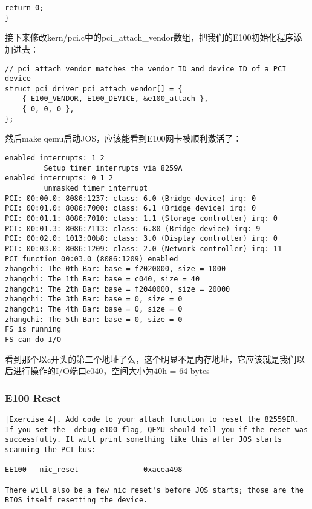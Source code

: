 \documentclass{article}
\begin{document}
\begin{CJK*}{UTF8}{gkai}
\begin{lstlisting}[style=ccode, title={\scriptsize \ttfamily \bfseries kern/e100.c}]
    return 0;
}
\end{lstlisting}

接下来修改kern/pci.c中的pci\_attach\_vendor数组，把我们的E100初始化程序添加进去：

\begin{lstlisting}[style=ccode, firstnumber=31, title={\scriptsize \ttfamily \bfseries kern/pci.c}]
// pci_attach_vendor matches the vendor ID and device ID of a PCI device
struct pci_driver pci_attach_vendor[] = {
	{ E100_VENDOR, E100_DEVICE, &e100_attach }, 
	{ 0, 0, 0 },
};
\end{lstlisting}

然后make qemu启动JOS，应该能看到E100网卡被顺利激活了：

\begin{lstlisting}[style=console]
enabled interrupts: 1 2
	     Setup timer interrupts via 8259A
enabled interrupts: 0 1 2
	     unmasked timer interrupt
PCI: 00:00.0: 8086:1237: class: 6.0 (Bridge device) irq: 0
PCI: 00:01.0: 8086:7000: class: 6.1 (Bridge device) irq: 0
PCI: 00:01.1: 8086:7010: class: 1.1 (Storage controller) irq: 0
PCI: 00:01.3: 8086:7113: class: 6.80 (Bridge device) irq: 9
PCI: 00:02.0: 1013:00b8: class: 3.0 (Display controller) irq: 0
PCI: 00:03.0: 8086:1209: class: 2.0 (Network controller) irq: 11
PCI function 00:03.0 (8086:1209) enabled
zhangchi: The 0th Bar: base = f2020000, size = 1000
zhangchi: The 1th Bar: base = c040, size = 40
zhangchi: The 2th Bar: base = f2040000, size = 20000
zhangchi: The 3th Bar: base = 0, size = 0
zhangchi: The 4th Bar: base = 0, size = 0
zhangchi: The 5th Bar: base = 0, size = 0
FS is running
FS can do I/O
\end{lstlisting}

看到那个以c开头的第二个地址了么，这个明显不是内存地址，它应该就是我们以后进行操作的I/O端口c040，空间大小为40h = 64 bytes


\subsubsection{E100 Reset}


\begin{lstlisting}[style=exercise]
|Exercise 4|. Add code to your attach function to reset the 82559ER. If you set the -debug-e100 flag, QEMU should tell you if the reset was successfully. It will print something like this after JOS starts scanning the PCI bus:

EE100   nic_reset               0xacea498

There will also be a few nic_reset's before JOS starts; those are the BIOS itself resetting the device.
\end{lstlisting}



\end{CJK*}
\end{document}
